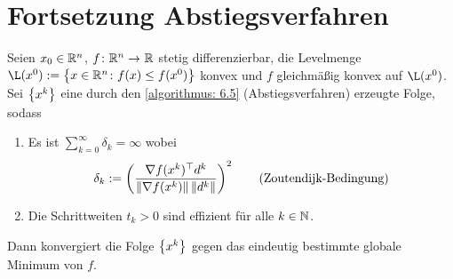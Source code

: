 \chapter{Fortsetzung Abstiegsverfahren}

\newcommand{\level}{\mathcal{L}}

\begin{satz} \label{satz 7.1}
	Seien $x_0 \in \mathbb{R}^n$, $\abb{f}{\R^n}{\R}$ stetig differenzierbar, die Levelmenge $\L (x^0) \defeq \menge{x \in \R^n \colon f(x) \le f(x^0)}$ konvex und $f$ gleichmäßig konvex auf $\L(x^0)$. Sei $\left\{ x^k \right\}_{}$ eine durch den \cref{algorithmus: 6.5} (Abstiegsverfahren) erzeugte Folge, sodass
	\begin{enumerate}
		\item Es ist $\sum_{k=0}^{\infty} \delta_k = \infty$ wobei
		\begin{equation*}
			\delta_k \mathrel{:=} \left( \frac{\nabla f(x^k)^{\top} d^k}{\left\lVert \nabla f(x^k) \right\rVert \left\lVert d^k \right\rVert} \right)^2 \tag{Zoutendijk-Bedingung}
		\end{equation*}
		\item Die Schrittweiten $t_k > 0$ sind effizient für alle $k \in \mathbb{N}$. 
	\end{enumerate}
	Dann konvergiert die Folge $\left\{ x^k \right\}_{}$ gegen das eindeutig bestimmte globale Minimum von $f$.
\end{satz}
